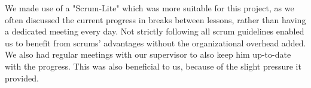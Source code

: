 We made use of a "Scrum-Lite" which was more suitable for this project, as we often discussed the current progress in breaks between lessons, rather than having a dedicated meeting every day. Not strictly following all scrum guidelines enabled us to benefit from scrums' advantages without the organizational overhead added. We also had regular meetings with our supervisor to also keep him up-to-date with the progress. This was also beneficial to us, because of the slight pressure it provided.

\newpage